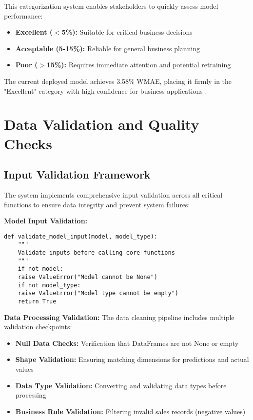 This categorization system enables stakeholders to quickly assess model performance:
\begin{itemize}
	\item \textbf{Excellent ($<$5\%):} Suitable for critical business decisions
	\item \textbf{Acceptable (5-15\%):} Reliable for general business planning
	\item \textbf{Poor ($>$15\%):} Requires immediate attention and potential retraining
\end{itemize}

The current deployed model achieves 3.58\% WMAE, placing it firmly in the "Excellent" category with high confidence for business applications .

\section{Data Validation and Quality Checks}

\subsection{Input Validation Framework}

The system implements comprehensive input validation across all critical functions to ensure data integrity and prevent system failures:

\textbf{Model Input Validation:}
\begin{lstlisting}[language=MyPython, caption={Model Input Validation Function}]
	def validate_model_input(model, model_type):
	"""
	Validate inputs before calling core functions
	"""
	if not model:
	raise ValueError("Model cannot be None")
	if not model_type:
	raise ValueError("Model type cannot be empty")
	return True
\end{lstlisting}

\textbf{Data Processing Validation:}
The data cleaning pipeline includes multiple validation checkpoints:
\begin{itemize}
	\item \textbf{Null Data Checks:} Verification that DataFrames are not None or empty
	\item \textbf{Shape Validation:} Ensuring matching dimensions for predictions and actual values
	\item \textbf{Data Type Validation:} Converting and validating data types before processing
	\item \textbf{Business Rule Validation:} Filtering invalid sales records (negative values)
\end{itemize}

